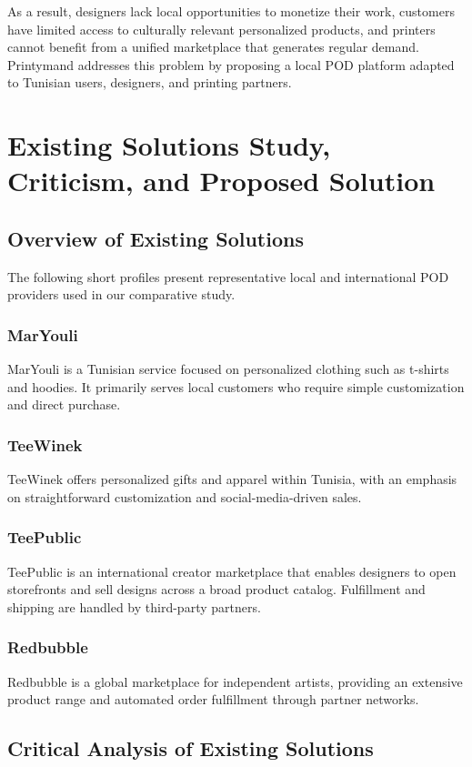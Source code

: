 As a result, designers lack local opportunities to monetize their work, customers have limited access to culturally relevant personalized products, and printers cannot benefit from a unified marketplace that generates regular demand. Printymand addresses this problem by proposing a local POD platform adapted to Tunisian users, designers, and printing partners.

\section{Existing Solutions Study, Criticism, and Proposed Solution}
\subsection{Overview of Existing Solutions}
The following short profiles present representative local and international POD providers used in our comparative study.

\subsubsection{MarYouli}
MarYouli is a Tunisian service focused on personalized clothing such as t-shirts and hoodies.
It primarily serves local customers who require simple customization and direct purchase.

\subsubsection{TeeWinek}
TeeWinek offers personalized gifts and apparel within Tunisia, with an emphasis on straightforward customization and social-media-driven sales.

\subsubsection{TeePublic}
TeePublic is an international creator marketplace that enables designers to open storefronts and sell designs across a broad product catalog.
Fulfillment and shipping are handled by third-party partners.

\subsubsection{Redbubble}
Redbubble is a global marketplace for independent artists, providing an extensive product range and automated order fulfillment through partner networks.

\subsection{Critical Analysis of Existing Solutions}
